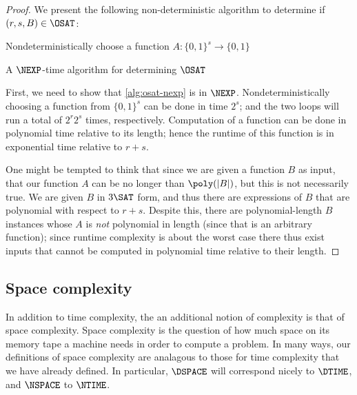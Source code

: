 \documentclass[english,12pt]{reedthesis}
\theoremstyle{plain}
\theoremstyle{definition}
\theoremstyle{remark}
\DeclarePairedDelimiter{\abs}{\lvert}{\rvert}
\begin{document}
\begin{proof}
  We present the following non-deterministic algorithm to determine if
  $(r, s, B) \in \OSAT$:

  \begin{algorithm}[H]
    Nondeterministically choose a function $A\colon \{0, 1\}^{s} \rightarrow \{0, 1\}$\;
    \;
    \caption{A $\NEXP$-time algorithm for determining $\OSAT$}\label{alg:osat-nexp}
  \end{algorithm}

  First, we need to show that \cref{alg:osat-nexp} is in $\NEXP$.
  Nondeterministically choosing a function from $\{0, 1\}^{s}$ can be done in
  time $2^{s}$; and the two loops will run a total of $2^{r}2^{s}$ times,
  respectively. Computation of a function can be done in polynomial time
  relative to its length; hence the runtime of this function is in exponential
  time relative to $r + s$.

  One might be tempted to think that since we are given a function $B$ as input,
  that our function $A$ can be no longer than $\poly(\abs{B})$, but this is not
  necessarily true. We are given $B$ in $3\SAT$ form, and thus there are
  expressions of $B$ that are polynomial with respect to $r + s$. Despite this,
  there are polynomial-length $B$ instances whose $A$ is \emph{not} polynomial
  in length (since that is an arbitrary function); since runtime complexity is
  about the worst case there thus exist inputs that cannot be computed in
  polynomial time relative to their length.
\end{proof}

\subsection{Space complexity}

In addition to time complexity, the an additional notion of complexity is that
of space complexity. Space complexity is the question of how much space on its
memory tape a machine needs in order to compute a problem. In many ways, our
definitions of space complexity are analagous to those for time complexity that
we have already defined. In particular, $\DSPACE$ will correspond nicely to
$\DTIME$, and $\NSPACE$ to $\NTIME$.
\end{document}
